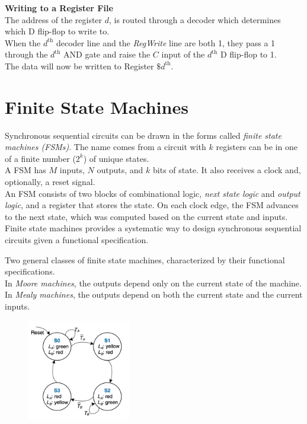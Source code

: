 \documentclass[12pt]{article}
\theoremstyle{definition}
\begin{document}
  \textbf{Writing to a Register File} \\
  The address of the register $d$, is routed through a decoder which determines which D flip-flop to write to. \\
  When the $d^{\text{th}}$ decoder line and the \emph{RegWrite} line are both 1, they pass a 1 through the $d^{\text{th}}$ AND gate and raise the $C$ input of the $d^{\text{th}}$ D flip-flop to 1. \\
  The data will now be written to Register $\$d^{\text{th}}$.

  \section{Finite State Machines}
  Synchronous sequential circuits can be drawn in the forms called \emph{finite state machines (FSMs)}.
  The name comes from a circuit with $k$ registers can be in one of a finite number ($2^{k}$) of unique states. \\
  A FSM has $M$ inputs, $N$ outputs, and $k$ bits of state.
  It also receives a clock and, optionally, a reset signal. \\
  An FSM consists of two blocks of combinational logic, \emph{next state logic} and \emph{output logic}, and a register that stores the state.
  On each clock edge, the FSM advances to the next state, which was computed based on the current state and inputs. \\
  Finite state machines provides a systematic way to design synchronous sequential circuits given a functional specification.

  Two general classes of finite state machines, characterized by their functional specifications. \\
  In \emph{Moore machines}, the outputs depend only on the current state of the machine. \\
  In \emph{Mealy machines}, the outputs depend on both the current state and the current inputs.

  \begin{figure}
    \includegraphics[width=0.4\textwidth]{pictures/stateTransistionDiagram.png}
  \end{figure}
\end{document}
